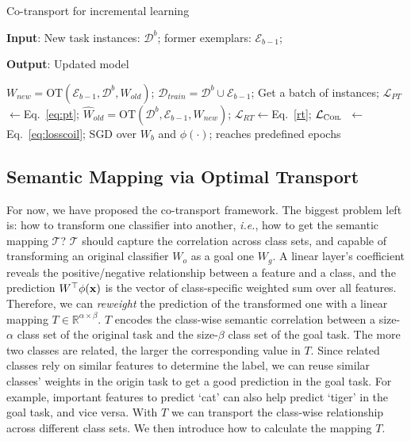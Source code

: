 \documentclass[sigconf]{acmart}
\newcommand{\x}{{\bf x}}
\newcommand{\D}{\mathcal{D}}
\newcommand{\T}{\mathcal{T}}
\newcommand{\R}{\mathbb{R}}
\newcommand{\ie}{\emph{i.e.}}
\newcommand{\name}{{\sc Coil }}
\begin{document}
{\begin{algorithm}[t]
		\caption{ Co-transport for incremental learning }
		\label{alg:coil}
		\raggedright
		{\bf Input}: New task instances: $\D^{b}$; former exemplars: $\mathcal{E}_{b-1}$;
		
		{\bf Output}: Updated model 
		\begin{algorithmic}[1]
			\State $W_{new}=\text{OT}(\mathcal{E}_{b-1},\mathcal{D}^{b},W_{old})$; 
			\State $\mathcal{D}_{train}=\D^{b} \cup\mathcal{E}_{b-1}$; 
			\Repeat
			\State Get a batch of instances;
			\State $\mathcal{L}_{PT}$$\leftarrow$Eq.~\ref{eq:pt}; 
			\State $\hat{W}_{old}=\text{OT}(\mathcal{D}^{b},\mathcal{E}_{b-1},W_{new})$;
			\State $\mathcal{L}_{RT}$$\leftarrow$Eq.~\ref{rt}; 
			\State $\mathcal{L}_\text{\name}$ $\leftarrow$Eq.~\ref{eq:losscoil};
			\State SGD over $W_b$ and $\phi(\cdot)$;
			\Until reaches predefined epochs
		\end{algorithmic} 
\end{algorithm}}

\subsection{Semantic Mapping via Optimal Transport}
For now, we have proposed the co-transport framework. The biggest problem left is: how to transform one classifier into another, \ie, how to get the semantic mapping $\T$?
$\T$ should capture the correlation across class sets, and capable of transforming an {original} classifier $W_{o}$ as a goal one $W_{g}$. 
A linear layer's coefficient reveals the positive/negative relationship between a feature and a class, and the prediction $W^\top \phi(\x)$ is the vector of class-specific weighted sum over all features. 
Therefore, we can \emph{reweight} the prediction of the transformed one with a linear mapping $T \in \R^{\alpha \times\beta}$. $T$ encodes the class-wise semantic correlation between a size-$\alpha$ class set of the original  task and the size-$\beta$ class set of the goal task. The more two classes are related, the larger the corresponding value in $T$. Since related classes rely on similar features to determine the label, we can reuse similar classes' weights in the origin task to get a good prediction in the goal task. For example, important features to predict `cat' can also help predict `tiger' in the goal task, and vice versa. With $T$ we can transport the class-wise relationship across different class sets. We then introduce how to calculate the mapping $T$.
\end{document}
